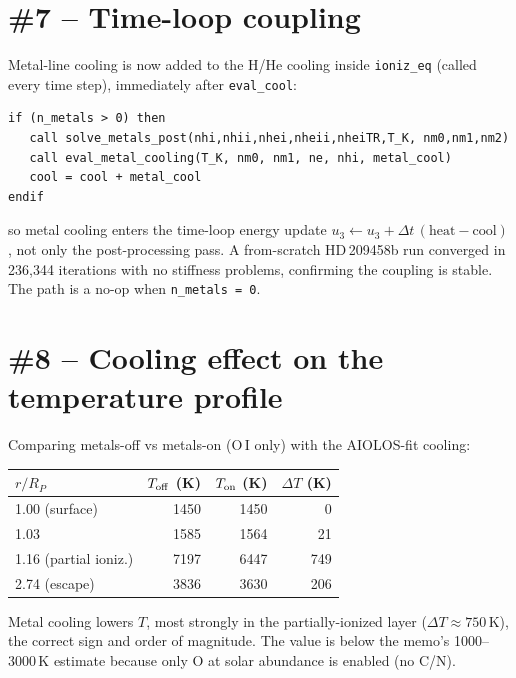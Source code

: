 \documentclass[english,a4paper]{my_memo}
\begin{document}
\section{\#7 -- Time-loop coupling}

Metal-line cooling is now added to the H/He cooling inside
\texttt{ioniz\_eq} (called every time step), immediately after
\texttt{eval\_cool}:
\begin{lstlisting}
if (n_metals > 0) then
   call solve_metals_post(nhi,nhii,nhei,nheii,nheiTR,T_K, nm0,nm1,nm2)
   call eval_metal_cooling(T_K, nm0, nm1, ne, nhi, metal_cool)
   cool = cool + metal_cool
endif
\end{lstlisting}
so metal cooling enters the time-loop energy update
$u_3 \leftarrow u_3 + \Delta t\,(\mathrm{heat}-\mathrm{cool})$, not only
the post-processing pass.  A from-scratch HD\,209458b run converged in
236{,}344 iterations with no stiffness problems, confirming the coupling
is stable.  The path is a no-op when \texttt{n\_metals = 0}.

\section{\#8 -- Cooling effect on the temperature profile}

Comparing metals-off vs metals-on (O\,I only) with the AIOLOS-fit
cooling:
\begin{center}
\begin{tabular}{lrrr}
\toprule
$r/R_P$ & $T_{\rm off}$ (K) & $T_{\rm on}$ (K) & $\Delta T$ (K) \\
\midrule
1.00 (surface) & 1450 & 1450 & 0 \\
1.03           & 1585 & 1564 & 21 \\
1.16 (partial ioniz.) & 7197 & 6447 & 749 \\
2.74 (escape)  & 3836 & 3630 & 206 \\
\bottomrule
\end{tabular}
\end{center}
Metal cooling lowers $T$, most strongly in the partially-ionized layer
($\Delta T \approx 750$\,K), the correct sign and order of magnitude.
The value is below the memo's 1000--3000\,K estimate because only O at
solar abundance is enabled (no C/N).
\end{document}
